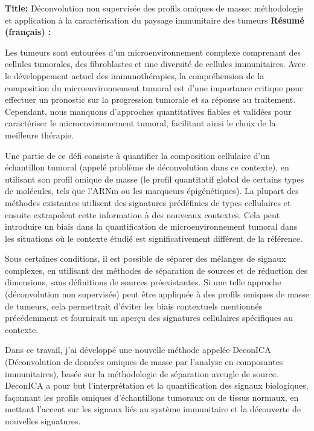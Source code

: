 \documentclass[12pt,]{book}
\theoremstyle{definition}
\theoremstyle{definition}
\theoremstyle{definition}
\theoremstyle{remark}
\begin{document}
\begin{titlepage}
\clearpage


\newpage
\thispagestyle{empty}
\noindent %

\textbf{Title: }
Déconvolution non supervisée des profils omiques de masse: méthodologie et application à la caractérisation du paysage immunitaire des tumeurs
\vskip 1cm
\textbf{Résumé (français) :}

Les tumeurs sont entourées d’un microenvironnement complexe comprenant des cellules tumorales, des fibroblastes et une diversité de cellules immunitaires. Avec le développement actuel des immunothérapies, la compréhension de la composition du microenvironnement tumoral est d'une importance critique pour effectuer un pronostic sur la progression tumorale et sa réponse au traitement. Cependant, nous manquons d'approches quantitatives fiables et validées pour caractériser le microenvironnement tumoral, facilitant ainsi le choix de la meilleure thérapie.

Une partie de ce défi consiste à quantifier la composition cellulaire d'un échantillon tumoral (appelé problème de déconvolution dans ce contexte), en utilisant son profil omique de masse (le profil quantitatif global de certains types de molécules, tels que l'ARNm ou les marqueurs épigénétiques). La plupart des méthodes existantes utilisent des signatures prédéfinies de types cellulaires et ensuite extrapolent cette information à des nouveaux contextes. Cela peut introduire un biais dans la quantification de microenvironnement tumoral dans les situations où le contexte étudié est significativement différent de la référence.

Sous certaines conditions, il est possible de séparer des mélanges de signaux complexes, en utilisant des méthodes de séparation de sources et de réduction des dimensions, sans définitions de sources préexistantes. Si une telle approche (déconvolution non supervisée) peut être appliquée à des profils omiques de masse de tumeurs, cela permettrait d'éviter les biais contextuels mentionnés précédemment et fournirait un aperçu des signatures cellulaires spécifiques au contexte.

Dans ce travail, j’ai développé une nouvelle méthode appelée DeconICA (Déconvolution de données omiques de masse par l'analyse en composantes immunitaires), basée sur la méthodologie de séparation aveugle de source. DeconICA a pour but l'interprétation et la quantification des signaux biologiques, façonnant les profils omiques d'échantillons tumoraux ou de tissus normaux, en mettant l'accent sur les signaux liés au système immunitaire et la découverte de nouvelles signatures.


\end{titlepage}
\end{document}
